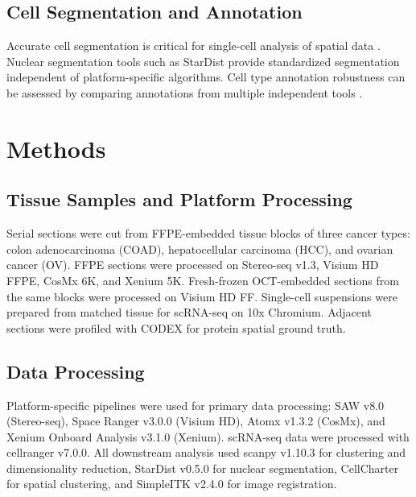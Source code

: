 \documentclass[11pt]{article}
\begin{document}
\subsection{Cell Segmentation and Annotation}
Accurate cell segmentation is critical for single-cell analysis of spatial data \citep{stringer2021cellpose}. Nuclear segmentation tools such as StarDist \citep{schmidt2018stardist} provide standardized segmentation independent of platform-specific algorithms. Cell type annotation robustness can be assessed by comparing annotations from multiple independent tools \citep{pasquini2021automated}.

\section{Methods}

\subsection{Tissue Samples and Platform Processing}
Serial sections were cut from FFPE-embedded tissue blocks of three cancer types: colon adenocarcinoma (COAD), hepatocellular carcinoma (HCC), and ovarian cancer (OV). FFPE sections were processed on Stereo-seq v1.3, Visium HD FFPE, CosMx 6K, and Xenium 5K. Fresh-frozen OCT-embedded sections from the same blocks were processed on Visium HD FF. Single-cell suspensions were prepared from matched tissue for scRNA-seq on 10x Chromium. Adjacent sections were profiled with CODEX for protein spatial ground truth.

\subsection{Data Processing}
Platform-specific pipelines were used for primary data processing: SAW v8.0 (Stereo-seq), Space Ranger v3.0.0 (Visium HD), Atomx v1.3.2 (CosMx), and Xenium Onboard Analysis v3.1.0 (Xenium). scRNA-seq data were processed with cellranger v7.0.0. All downstream analysis used scanpy v1.10.3 \citep{wolf2018scanpy} for clustering and dimensionality reduction, StarDist v0.5.0 \citep{schmidt2018stardist} for nuclear segmentation, CellCharter for spatial clustering, and SimpleITK v2.4.0 for image registration.
\end{document}
